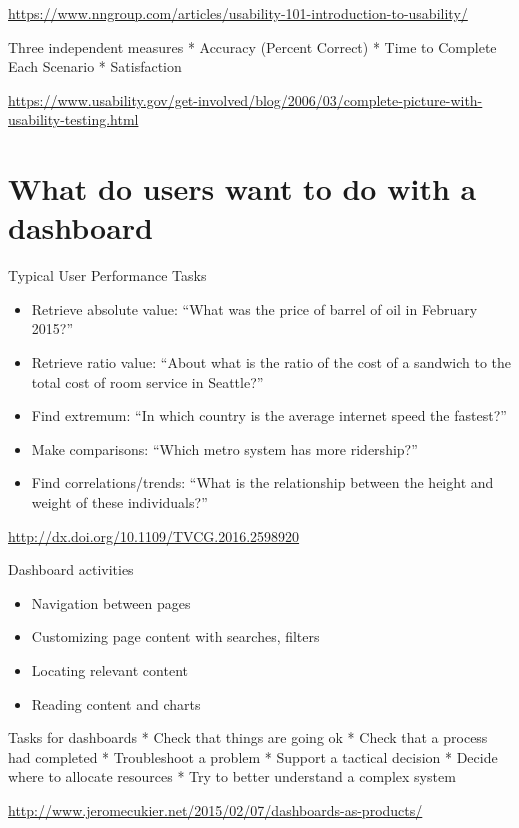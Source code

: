 \documentclass[
]{krantz}
\providecommand{\tightlist}{%
  \setlength{\itemsep}{0pt}\setlength{\parskip}{0pt}}
\begin{document}
\url{https://www.nngroup.com/articles/usability-101-introduction-to-usability/}

Three independent measures
* Accuracy (Percent Correct)
* Time to Complete Each Scenario
* Satisfaction

\url{https://www.usability.gov/get-involved/blog/2006/03/complete-picture-with-usability-testing.html}

\hypertarget{what-do-users-want-to-do-with-a-dashboard}{%
\section{What do users want to do with a dashboard}\label{what-do-users-want-to-do-with-a-dashboard}}

Typical User Performance Tasks

\begin{itemize}
\item
  Retrieve absolute value: ``What was the price of barrel of oil in February 2015?''
\item
  Retrieve ratio value: ``About what is the ratio of the cost of a sandwich to the
  total cost of room service in Seattle?''
\item
  Find extremum: ``In which country is the average internet speed the fastest?''
\item
  Make comparisons: ``Which metro system has more ridership?''
\item
  Find correlations/trends: ``What is the relationship between the height
  and weight of these individuals?''
\end{itemize}

\url{http://dx.doi.org/10.1109/TVCG.2016.2598920}

Dashboard activities

\begin{itemize}
\tightlist
\item
  Navigation between pages
\item
  Customizing page content with searches, filters
\item
  Locating relevant content
\item
  Reading content and charts
\end{itemize}

Tasks for dashboards
* Check that things are going ok
* Check that a process had completed
* Troubleshoot a problem
* Support a tactical decision
* Decide where to allocate resources
* Try to better understand a complex system

\url{http://www.jeromecukier.net/2015/02/07/dashboards-as-products/}
\end{document}
